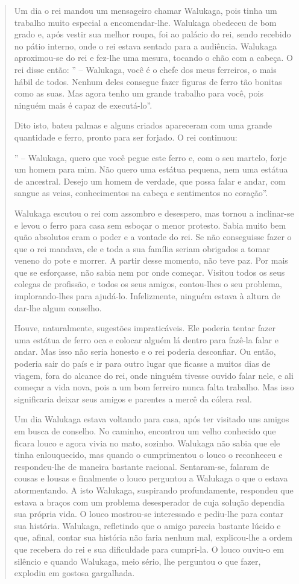 \documentclass[
  letterpaper,
  DIV=11,
  numbers=noendperiod]{scrreprt}
\begin{document}
\begin{quote}
Um dia o rei mandou um mensageiro chamar Walukaga, pois tinha um
trabalho muito especial a encomendar-lhe. Walukaga obedeceu de bom grado
e, após vestir sua melhor roupa, foi ao palácio do rei, sendo recebido
no pátio interno, onde o rei estava sentado para a audiência. Walukaga
aproximou-se do rei e fez-lhe uma mesura, tocando o chão com a cabeça. O
rei disse então: '' -- Walukaga, você é o chefe dos meus ferreiros, o
mais hábil de todos. Nenhum deles consegue fazer figuras de ferro tão
bonitas como as suas. Mas agora tenho um grande trabalho para você, pois
ninguém mais é capaz de executá-lo''.

Dito isto, bateu palmas e alguns criados apareceram com uma grande
quantidade e ferro, pronto para ser forjado. O rei continuou:

'' -- Walukaga, quero que você pegue este ferro e, com o seu martelo,
forje um homem para mim. Não quero uma estátua pequena, nem uma estátua
de ancestral. Desejo um homem de verdade, que possa falar e andar, com
sangue as veias, conhecimentos na cabeça e sentimentos no coração''.

Walukaga escutou o rei com assombro e desespero, mas tornou a
inclinar-se e levou o ferro para casa sem esboçar o menor protesto.
Sabia muito bem quão absolutos eram o poder e a vontade do rei. Se não
conseguisse fazer o que o rei mandava, ele e toda a sua família seriam
obrigados a tomar veneno do pote e morrer. A partir desse momento, não
teve paz. Por mais que se esforçasse, não sabia nem por onde começar.
Visitou todos os seus colegas de profissão, e todos os seus amigos,
contou-lhes o seu problema, implorando-lhes para ajudá-lo. Infelizmente,
ninguém estava à altura de dar-lhe algum conselho.

Houve, naturalmente, sugestões impraticáveis. Ele poderia tentar fazer
uma estátua de ferro oca e colocar alguém lá dentro para fazê-la falar e
andar. Mas isso não seria honesto e o rei poderia desconfiar. Ou então,
poderia sair do país e ir para outro lugar que ficasse a muitos dias de
viagem, fora do alcance do rei, onde ninguém tivesse ouvido falar nele,
e ali começar a vida nova, pois a um bom ferreiro nunca falta trabalho.
Mas isso significaria deixar seus amigos e parentes a mercê da cólera
real.

Um dia Walukaga estava voltando para casa, após ter visitado uns amigos
em busca de conselho. No caminho, encontrou um velho conhecido que
ficara louco e agora vivia no mato, sozinho. Walukaga não sabia que ele
tinha enlouquecido, mas quando o cumprimentou o louco o reconheceu e
respondeu-lhe de maneira bastante racional. Sentaram-se, falaram de
cousas e lousas e finalmente o louco perguntou a Walukaga o que o estava
atormentando. A isto Walukaga, suspirando profundamente, respondeu que
estava a braços com um problema desesperador de cuja solução dependia
sua própria vida. O louco mostrou-se interessado e pediu-lhe para contar
sua história. Walukaga, refletindo que o amigo parecia bastante lúcido e
que, afinal, contar sua história não faria nenhum mal, explicou-lhe a
ordem que recebera do rei e sua dificuldade para cumpri-la. O louco
ouviu-o em silêncio e quando Walukaga, meio sério, lhe perguntou o que
fazer, explodiu em gostosa gargalhada.


\end{quote}
\end{document}
